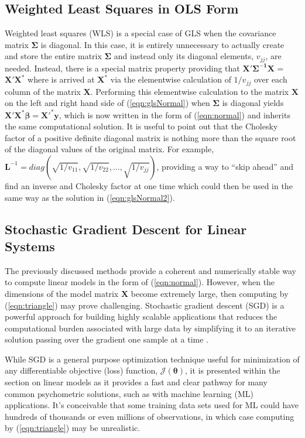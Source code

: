 \documentclass[12pt]{article}
\begin{document}
\subsection*{Weighted Least Squares in OLS Form}

Weighted least squares (WLS) is a special case of GLS when the covariance matrix $\bm{\Sigma}$ is diagonal. In this case, it is entirely unnecessary to actually create and store the entire matrix $\bm{\Sigma}$ and instead only its diagonal elements, $v_{jj}$, are needed. Instead, there is a special matrix property providing that $\bm{X'\Sigma^{-1}X}$ =  $\bm{X'X^*}$ where is arrived at $\bm{X}^*$ via the elementwise calculation of $1/v_{jj}$ over each column of the matrix $\bm{X}$. Performing this elementwise calculation to the matrix $\bm{X}$ on the left and right hand side of (\ref{eqn:glsNormal}) when $\bm{\Sigma}$ is diagonal yields $\bm{X'X^*}\bm{\beta} = \bm{X'^{*}y}$, which is now written in the form of (\ref{eqn:normal}) and inherits the same computational solution. It is useful to point out that the Cholesky factor of a positive definite diagonal matrix is nothing more than the square root of the diagonal values of the original matrix. For example, $\bm{L}^{-1} = diag(\sqrt{1/v_{11}},\sqrt{1/v_{22}}, \ldots, \sqrt{1/v_{jj}})$, providing a way to ``skip ahead'' and find an inverse and Cholesky factor at one time which could then be used in the same way as the solution in (\ref{eqn:glsNormal2}). 

\subsection*{Stochastic Gradient Descent for Linear Systems}

The previously discussed methods provide a coherent and numerically stable way to compute linear models in the form of (\ref{eqn:normal}). However, when the dimensions of the model matrix $\bm{X}$ become extremely large, then computing by (\ref{eqn:triangle}) may prove challenging. Stochastic gradient descent (SGD) is a powerful approach for building highly scalable applications that reduces the computational burden associated with large data by simplifying it to an iterative solution passing over the gradient one sample at a time \cite{cizek,shamir,tran}.  

While SGD is a general purpose optimization technique useful for minimization of any differentiable objective (loss) function, $\mathcal{J}(\bm{\theta})$, it is presented within the section on linear models as it provides a fast and clear pathway for many common psychometric solutions, such as with machine learning (ML) applications. It's conceivable that some training data sets used for ML could have hundreds of thousands or even millions of observations, in which case computing by (\ref{eqn:triangle}) may be unrealistic.   
\end{document}

